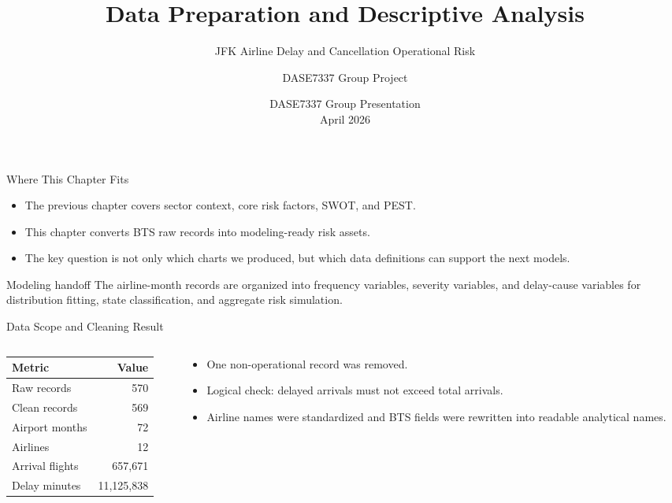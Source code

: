 \documentclass[10pt,aspectratio=169]{beamer}
\title[The University of Hong Kong]{Data Preparation and Descriptive Analysis}
\subtitle{JFK Airline Delay and Cancellation Operational Risk}
\author[DASE7337 Group Project]{DASE7337 Group Project}
\institute[HKU]{The University of Hong Kong}
\date[April 2026]{DASE7337 Group Presentation \\ April 2026}
\begin{document}
\begin{frame}
  \titlepage
\end{frame}

\begin{frame}{Where This Chapter Fits}
  \begin{itemize}
    \item The previous chapter covers sector context, core risk factors, SWOT, and PEST.
    \item This chapter converts BTS raw records into modeling-ready risk assets.
    \item The key question is not only which charts we produced, but which data definitions can support the next models.
  \end{itemize}
  \vspace{0.4em}
  \begin{block}{Modeling handoff}
  The airline-month records are organized into frequency variables, severity variables, and delay-cause variables for distribution fitting, state classification, and aggregate risk simulation.
  \end{block}
\end{frame}

\begin{frame}{Data Scope and Cleaning Result}
  \begin{columns}[T,totalwidth=\linewidth]
    \begin{column}{0.48\linewidth}
      \begin{table}
      \small
      \begin{tabular}{lr}
      \toprule
      Metric & Value \\
      \midrule
      Raw records & 570 \\
      Clean records & 569 \\
      Airport months & 72 \\
      Airlines & 12 \\
      Arrival flights & 657,671 \\
      Delay minutes & 11,125,838 \\
      \bottomrule
      \end{tabular}
      \end{table}
    \end{column}
    \begin{column}{0.48\linewidth}
      \begin{itemize}
        \item One non-operational record was removed.
        \item Logical check: delayed arrivals must not exceed total arrivals.
        \item Airline names were standardized and BTS fields were rewritten into readable analytical names.
      \end{itemize}
    \end{column}
  \end{columns}
\end{frame}
\end{document}
